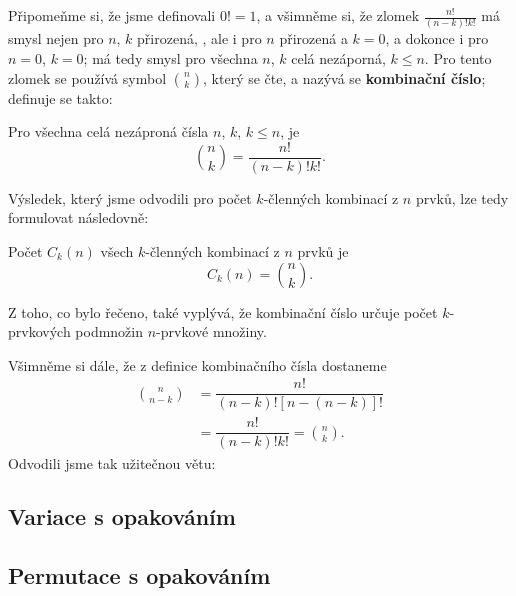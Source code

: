         Připomeňme si, že jsme definovali \(0! = 1\), a všimněme si, že zlomek
        \(\frac{n!}{(n-k)!k!}\) má smysl nejen pro \(n\), \(k\) přirozená, , ale i pro \(n\)
        přirozená a \(k=0\), a dokonce i pro \(n = 0\), \(k = 0\); má tedy smysl pro všechna \(n\),
        \(k\) celá nezáporná, \(k\leq n\). Pro tento zlomek se používá symbol \(\binom{n}{k}\),
        který se čte,  a nazývá se \textbf{kombinační číslo}; definuje se takto:

        \begin{mdframed}[style=highlight] 
          Pro všechna celá nezáproná čísla \(n\), \(k\), \(k\leq n\), je 
          \begin{equation*}
            \binom{n}{k} = \dfrac{n!}{(n-k)!k!}.
          \end{equation*}  
        \end{mdframed}

        Výsledek, který jsme odvodili pro počet \(k\)-členných kombinací z \(n\) prvků, lze tedy
        formulovat následovně:
        \begin{mdframed}[style=highlight] 
          Počet \(C_k(n)\) všech \(k\)-členných kombinací z \(n\) prvků je 
          \begin{equation*}
            C_k(n) = \binom{n}{k}.
          \end{equation*}  
        \end{mdframed}     
        
        Z toho, co bylo řečeno, také vyplývá, že kombinační číslo určuje počet \(k\)-prvkových
        podmnožin \(n\)-prvkové množiny.

        Všimněme si dále, že z definice kombinačního čísla dostaneme
        \begin{align*}
          \binom{n}{n-k} &= \dfrac{n!}{(n-k)![n-(n-k)]!}             \\
                         &= \dfrac{n!}{(n-k)!k!} = \binom{n}{k}.
        \end{align*}  
        Odvodili jsme tak užitečnou větu:



      \subsection{Variace s opakováním}\label{mai:IchapIVsecIssecV}
      \subsection{Permutace s opakováním}\label{mai:IchapIVsecIssecVI}
